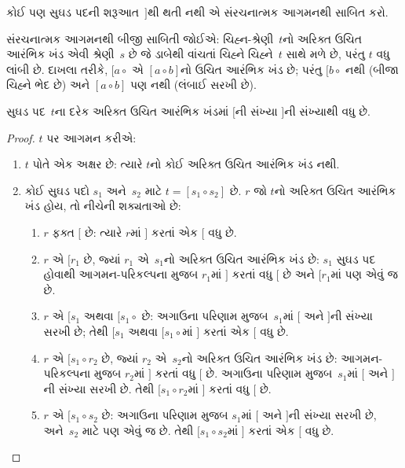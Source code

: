 \begin{prob}
  કોઈ પણ સુઘડ પદની શરૂઆત~$]$થી થતી નથી
  એ સંરચનાત્મક આગમનથી સાબિત કરો.
\end{prob}

સંરચનાત્મક આગમનથી બીજી સાબિતી જોઈએ:
ચિહ્ન-શ્રેણી~$t$નો અરિક્ત ઉચિત આરંભિક ખંડ
એવી શ્રેણી~$s$ છે જે ડાબેથી વાંચતાં ચિહ્ને
ચિહ્ને~$t$ સાથે મળે છે, પરંતુ $t$ વધુ લાંબી
છે. દાખલા તરીકે, $[a \circ {}$ એ
$[a \circ b]$નો ઉચિત આરંભિક ખંડ છે; પરંતુ
$[b \circ {}$ નથી (બીજા ચિહ્ને ભેદ છે)
અને $[a \circ b]$ પણ નથી (લંબાઈ સરખી છે).

\begin{prop}
  સુઘડ પદ~$t$ના દરેક અરિક્ત ઉચિત આરંભિક ખંડમાં
  $[$ની સંખ્યા $]$ની સંખ્યાથી વધુ છે.
\end{prop}

\begin{proof}
  $t$ પર આગમન કરીએ:
  \begin{enumerate}
  \item $t$ પોતે એક અક્ષર છે: ત્યારે $t$નો
    કોઈ અરિક્ત ઉચિત આરંભિક ખંડ નથી.
  \item કોઈ સુઘડ પદો $s_1$ અને~$s_2$ માટે
    $t = [s_1 \circ s_2]$ છે. $r$ જો $t$નો
    અરિક્ત ઉચિત આરંભિક ખંડ હોય, તો નીચેની
    શક્યતાઓ છે:
    \begin{enumerate}
    \item $r$ ફક્ત $[$ છે: ત્યારે $r$માં
      $]$ કરતાં એક $[$ વધુ છે.
    \item $r$ એ $[r_1$ છે, જ્યાં $r_1$ એ~$s_1$નો
      અરિક્ત ઉચિત આરંભિક ખંડ છે: $s_1$ સુઘડ પદ
      હોવાથી આગમન-પરિકલ્પના મુજબ $r_1$માં
      $]$ કરતાં વધુ $[$ છે અને $[r_1$માં
      પણ એવું જ છે.
    \item $r$ એ $[s_1$ અથવા $[s_1 \circ {}$
      છે: અગાઉના પરિણામ મુજબ~$s_1$માં $[$
      અને $]$ની સંખ્યા સરખી છે; તેથી
      $[s_1$ અથવા $[s_1 \circ {}$માં
      $]$ કરતાં એક $[$ વધુ છે.
    \item $r$ એ $[s_1 \circ r_2$ છે, જ્યાં
      $r_2$ એ~$s_2$નો અરિક્ત ઉચિત આરંભિક ખંડ છે:
      આગમન-પરિકલ્પના મુજબ $r_2$માં $]$
      કરતાં વધુ $[$ છે. અગાઉના પરિણામ
      મુજબ~$s_1$માં $[$ અને $]$ની સંખ્યા
      સરખી છે. તેથી $[s_1 \circ r_2$માં
      $]$ કરતાં વધુ $[$ છે.
    \item $r$ એ $[s_1 \circ s_2$ છે:
      અગાઉના પરિણામ મુજબ $s_1$માં $[$
      અને $]$ની સંખ્યા સરખી છે, અને~$s_2$
      માટે પણ એવું જ છે. તેથી
      $[s_1 \circ s_2$માં $]$ કરતાં એક
      $[$ વધુ છે.
    \end{enumerate}
  \end{enumerate}
\end{proof}
\endgroup


